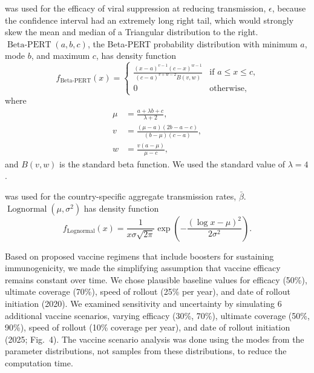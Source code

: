 \documentclass{article}
\DeclareMathOperator{\Lognormal}{Lognormal}
\DeclareMathOperator{\BetaPERT}{Beta-PERT}
\begin{document}
\begin{description}[labelsep=0.6ex]
\item[Beta-PERT] was used for the efficacy of viral suppression at
  reducing transmission, $\epsilon$, because the confidence interval
  had an extremely long right tail\cite{Donnell2010-xo}, which would
  strongly skew the mean and median of a Triangular distribution to
  the right.  $\BetaPERT(a, b, c)$, the Beta-PERT probability
  distribution\cite{malcom1959} with minimum $a$, mode $b$, and
  maximum $c$, has density function
  \begin{equation}
    \label{BetaPERT}
    f_{\BetaPERT}(x) =
    \begin{cases}
      \frac{(x - a)^{v - 1} (c - x)^{w - 1}}{(c - a)^{v + w - 2} B(v, w)}
      & \text{if $a \leq x \leq c$,}
      \\
      0 & \text{otherwise,}
    \end{cases}
  \end{equation}
  where
  \begin{equation}
    \begin{split}
      \mu &= \frac{a + \lambda b + c}{\lambda + 2},
      \\
      v &= \frac{(\mu - a)(2 b - a - c)}{(b - \mu) (c - a)},
      \\
      w &= \frac{v (a - \mu)}{\mu - c},
    \end{split}
  \end{equation}
  and $B(v, w)$ is the standard beta function.\cite{davis1972}
  We used the standard value of $\lambda = 4$.

\item[Lognormal] was used for the country-specific aggregate
  transmission rates, $\bar{\beta}$.  $\Lognormal(\mu, \sigma^2)$
  has density function
  \begin{equation}
    f_{\Lognormal}(x) = \frac{1}{x \sigma \sqrt{2 \pi}}
    \exp\left(- \frac{\left(\log x - \mu\right)^2}{2 \sigma^2}\right).
  \end{equation}
\end{description}

Based on proposed vaccine regimens that include boosters for
sustaining immunogenicity\cite{gray_2016}, we made the simplifying
assumption that vaccine efficacy remains constant over time. We chose
plausible baseline values for efficacy (50\%), ultimate coverage
(70\%), speed of rollout (25\% per year), and date of rollout
initiation (2020). We examined sensitivity and uncertainty by
simulating 6 additional vaccine scenarios, varying efficacy (30\%,
70\%), ultimate coverage (50\%, 90\%), speed of rollout (10\% coverage
per year), and date of rollout initiation (2025; Fig.~4). The vaccine
scenario analysis was done using the modes from the parameter
distributions, not samples from these distributions, to reduce the
computation time.




\end{document}
